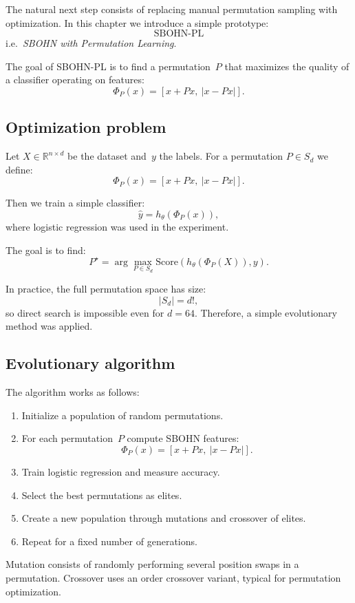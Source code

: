 \documentclass[11pt,a4paper]{report}
\begin{document}
The natural next step consists of replacing manual permutation sampling with optimization. In this chapter we introduce a simple prototype:
\[
\boxed{\mathrm{SBOHN\text{-}PL}}
\]
i.e.\ \emph{SBOHN with Permutation Learning}.

The goal of SBOHN-PL is to find a permutation~$P$ that maximizes the quality of a classifier operating on features:
\[
\Phi_P(x)=
[x+Px,\ |x-Px|].
\]

\subsection{Optimization problem}

Let $X\in\mathbb R^{n\times d}$ be the dataset and~$y$ the labels. For a permutation $P\in S_d$ we define:
\[
\Phi_P(x)=
[x+Px,\ |x-Px|].
\]

Then we train a simple classifier:
\[
\hat y =
h_\theta(\Phi_P(x)),
\]
where logistic regression was used in the experiment.

The goal is to find:
\[
P^\star
=
\arg\max_{P\in S_d}
\mathrm{Score}
\left(
h_\theta(\Phi_P(X)),y
\right).
\]

In practice, the full permutation space has size:
\[
|S_d|=d!,
\]
so direct search is impossible even for $d=64$. Therefore, a simple evolutionary method was applied.

\subsection{Evolutionary algorithm}

The algorithm works as follows:

\begin{enumerate}
\item Initialize a population of random permutations.
\item For each permutation~$P$ compute SBOHN features:
\[
\Phi_P(x)=[x+Px,\ |x-Px|].
\]
\item Train logistic regression and measure accuracy.
\item Select the best permutations as elites.
\item Create a new population through mutations and crossover of elites.
\item Repeat for a fixed number of generations.
\end{enumerate}

Mutation consists of randomly performing several position swaps in a permutation. Crossover uses an order crossover variant, typical for permutation optimization.
\end{document}
